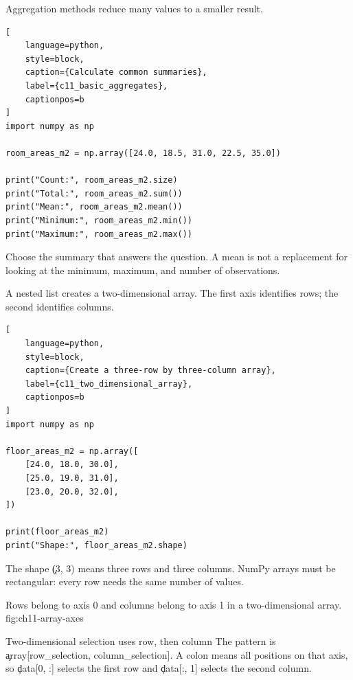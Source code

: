 
Aggregation methods reduce many values to a smaller result.

\begin{lstlisting}[
    language=python,
    style=block,
    caption={Calculate common summaries},
    label={c11_basic_aggregates},
    captionpos=b
]
import numpy as np

room_areas_m2 = np.array([24.0, 18.5, 31.0, 22.5, 35.0])

print("Count:", room_areas_m2.size)
print("Total:", room_areas_m2.sum())
print("Mean:", room_areas_m2.mean())
print("Minimum:", room_areas_m2.min())
print("Maximum:", room_areas_m2.max())
\end{lstlisting}

Choose the summary that answers the question. A mean is not a replacement for
looking at the minimum, maximum, and number of observations.


A nested list creates a two-dimensional array. The first axis identifies rows;
the second identifies columns.

\begin{lstlisting}[
    language=python,
    style=block,
    caption={Create a three-row by three-column array},
    label={c11_two_dimensional_array},
    captionpos=b
]
import numpy as np

floor_areas_m2 = np.array([
    [24.0, 18.0, 30.0],
    [25.0, 19.0, 31.0],
    [23.0, 20.0, 32.0],
])

print(floor_areas_m2)
print("Shape:", floor_areas_m2.shape)
\end{lstlisting}

The shape \c{(3, 3)} means three rows and three columns. NumPy arrays must be
rectangular: every row needs the same number of values.

{Rows belong to axis 0 and columns belong to axis 1 in a two-dimensional array.}
{fig:ch11-array-axes}

\begin{SyntaxBox}{Two-dimensional selection uses row, then column}
The pattern is \c{array[row_selection, column_selection]}. A colon means all
positions on that axis, so \c{data[0, :]} selects the first row and
\c{data[:, 1]} selects the second column.
\end{SyntaxBox}


